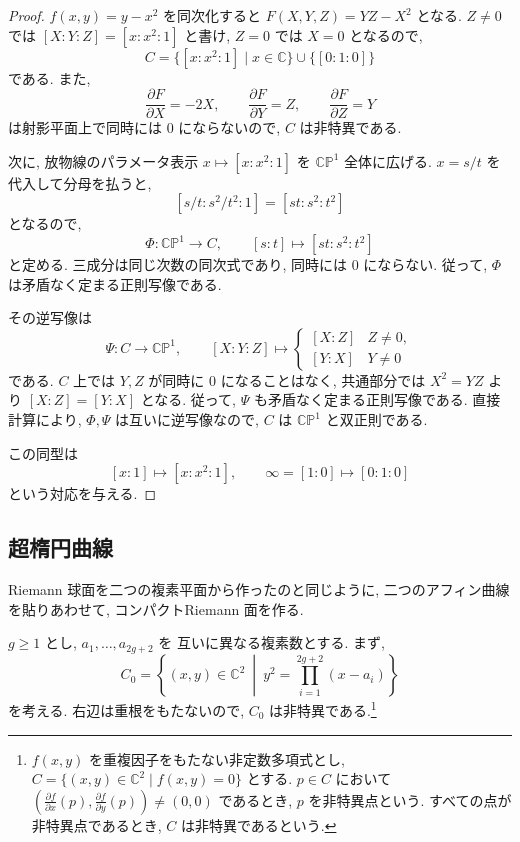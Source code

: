 \documentclass[dvipdfmx,a4paper,11pt]{article} %
\newcommand{\C}{\mathbb{C}}
\theoremstyle{definition}
\numberwithin{equation}{section}
\begin{document}
\begin{proof}
$f(x,y)=y-x^2$ を同次化すると $F(X,Y,Z)=YZ-X^2$ となる.
$Z\neq0$ では $[X:Y:Z]=[x:x^2:1]$ と書け, 
$Z=0$ では $X=0$ となるので, 
\[
C=\{[x:x^2:1]\mid x\in\C\}\cup\{[0:1:0]\}
\]
である.
また, 
\[
\frac{\partial F}{\partial X}=-2X,\qquad \frac{\partial F}{\partial Y}=Z,\qquad \frac{\partial F}{\partial Z}=Y
\]
は射影平面上で同時には $0$ にならないので, $C$ は非特異である.

次に, 放物線のパラメータ表示 $x\mapsto[x:x^2:1]$ を
$\C\mathbb P^1$ 全体に広げる.
$x=s/t$ を代入して分母を払うと, 
\[
[s/t:s^2/t^2:1]=[st:s^2:t^2]
\]
となるので, 
\[
\Phi:\C\mathbb P^1\longrightarrow C,\qquad
[s:t]\longmapsto[st:s^2:t^2]
\]
と定める.
三成分は同じ次数の同次式であり, 同時には $0$ にならない.
従って, $\Phi$ は矛盾なく定まる正則写像である.

その逆写像は
\[
\Psi:C\longrightarrow\C\mathbb P^1,\qquad
[X:Y:Z]\longmapsto
\begin{cases}
[X:Z] & Z\neq0,\\
[Y:X] & Y\neq0
\end{cases}
\]
である.
$C$ 上では $Y,Z$ が同時に $0$ になることはなく, 
共通部分では $X^2=YZ$ より $[X:Z]=[Y:X]$ となる.
従って, $\Psi$ も矛盾なく定まる正則写像である.
直接計算により, $\Phi,\Psi$ は互いに逆写像なので, 
$C$ は $\C\mathbb P^1$ と双正則である.

この同型は
\[
[x:1]\longmapsto[x:x^2:1],\qquad
\infty=[1:0]\longmapsto[0:1:0]
\]
という対応を与える.
\end{proof}



\subsection{超楕円曲線}\label{O-S029}

Riemann 球面を二つの複素平面から作ったのと同じように, 
二つのアフィン曲線を貼りあわせて, コンパクトRiemann 面を作る.

$g\geq1$ とし, $a_1,\ldots,a_{2g+2}$ を
互いに異なる複素数とする.
まず, 
\begin{equation}\label{O-EQ037}
C_0=\left\{(x,y)\in\C^2\ \middle|\
y^2=\prod_{i=1}^{2g+2}(x-a_i)\right\}
\end{equation}
を考える.
右辺は重根をもたないので, $C_0$ は非特異である.\footnote{$f(x,y)$ を重複因子をもたない非定数多項式とし, 
$C=\{(x,y)\in\C^2\mid f(x,y)=0\}$ とする.
$p\in C$ において
\(
(\frac{\partial f}{\partial x}(p),\frac{\partial f}{\partial y}(p))\neq(0,0)
\)
であるとき, $p$ を非特異点という.
すべての点が非特異点であるとき, $C$ は非特異であるという.}
\end{document}
